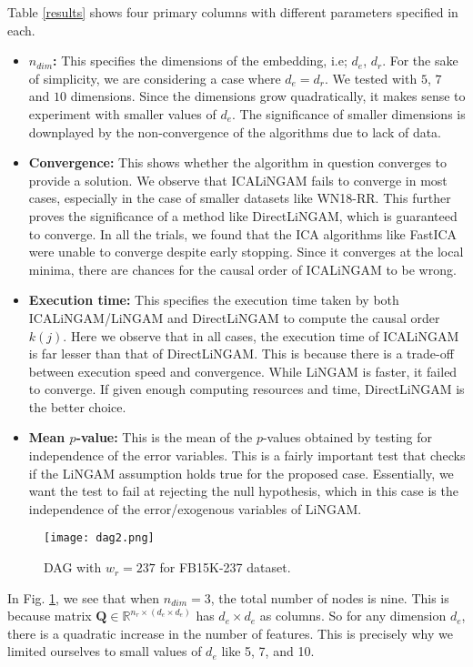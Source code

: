 \documentclass{article}
\begin{document}
Table \ref{results} shows four primary columns with different parameters specified in each.
\begin{itemize}
    \item \textbf{$n_{dim}$:} This specifies the dimensions of the embedding, i.e; $d_e$, $d_r$. For the sake of simplicity, we are considering a case where $d_e = d_r$. We tested with $5$, $7$ and $10$ dimensions. Since the dimensions grow quadratically, it makes sense to experiment with smaller values of $d_e$. The significance of smaller dimensions is downplayed by the non-convergence of the algorithms due to lack of data.
    
    \item \textbf{Convergence: } This shows whether the algorithm in question converges to provide a solution. We observe that ICALiNGAM fails to converge in most cases, especially in the case of smaller datasets like WN18-RR. This further proves the significance of a method like DirectLiNGAM, which is guaranteed to converge. In all the trials, we found that the ICA algorithms like FastICA were unable to converge despite early stopping. Since it converges at the local minima, there are chances for the causal order of ICALiNGAM to be wrong.
    
    \item \textbf{Execution time:} This specifies the execution time taken by both ICALiNGAM/LiNGAM and DirectLiNGAM to compute the causal order $k(j)$. Here we observe that in all cases, the execution time of ICALiNGAM is far lesser than that of DirectLiNGAM. This is because there is a trade-off between execution speed and convergence. While LiNGAM is faster, it failed to converge.
    If given enough computing resources and time, DirectLiNGAM is the better choice. 
    \item \textbf{Mean $p$-value:} This is the mean of the $p$-values obtained by testing for independence of the error variables. This is a fairly important test that checks if the LiNGAM assumption holds true for the proposed case. Essentially, we want the test to fail at rejecting the null hypothesis, which in this case is the independence of the error/exogenous variables of LiNGAM.
\end{itemize}

\begin{figure}[h!]
    \centering
    \texttt{[image: dag2.png]}
    \caption{DAG with $w_r = 237$ for FB15K-237 dataset.}
    \label{dag_figure}
\end{figure}
In Fig. \ref{dag_figure}, we see that when $n_{dim} = 3$, the total number of nodes is nine. This is because matrix $\textbf{Q} \in \mathbb{R}^{n_r \times (d_e \times d_e)}$ has $d_e \times d_e$ as columns. So for any dimension $d_e$, there is a quadratic increase in the number of features. This is precisely why we limited ourselves to small values of $d_e$ like 5, 7, and 10.
\end{document}
